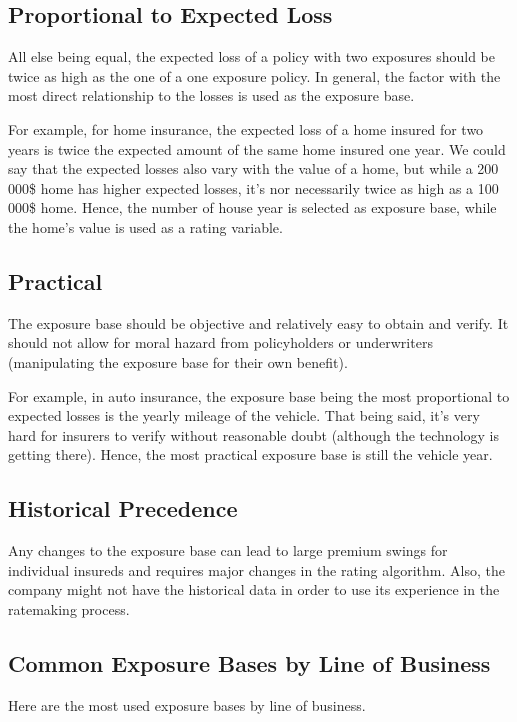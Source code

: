 \documentclass[11pt, english]{memoir}
\numberwithin{definition}{section}
\begin{document}
	\subsection{Proportional to Expected Loss}
	All else being equal, the expected loss of a policy with two exposures should be twice as high as the one of a one exposure policy. In general, the factor with the most direct relationship to the losses is used as the exposure base. 
	
	For example, for home insurance, the expected loss of a home insured for two years is twice the expected amount of the same home insured one year. We could say that the expected losses also vary with the value of a home, but while a 200 000\$ home has higher expected losses, it's nor necessarily twice as high as a 100 000\$ home. Hence, the number of house year is selected as exposure base, while the home's value is used as a rating variable.  
	
	\subsection{Practical}
	The exposure base should be objective and relatively easy to obtain and verify. It should not allow for moral hazard from policyholders or underwriters (manipulating the exposure base for their own benefit). 
	
	For example, in auto insurance, the exposure base being the most proportional to expected losses is the yearly mileage of the vehicle. That being said, it's very hard for insurers to verify without reasonable doubt (although the technology is getting there). Hence, the most practical exposure base is still the vehicle year. 
	
	\subsection{Historical Precedence}
	Any changes to the exposure base can lead to large premium swings for individual insureds and requires major changes in the rating algorithm. Also, the company might not have the historical data in order to use its experience in the ratemaking process. 
	
	\subsection{Common Exposure Bases by Line of Business}
	Here are the most used exposure bases by line of business. 
	
\end{document}

